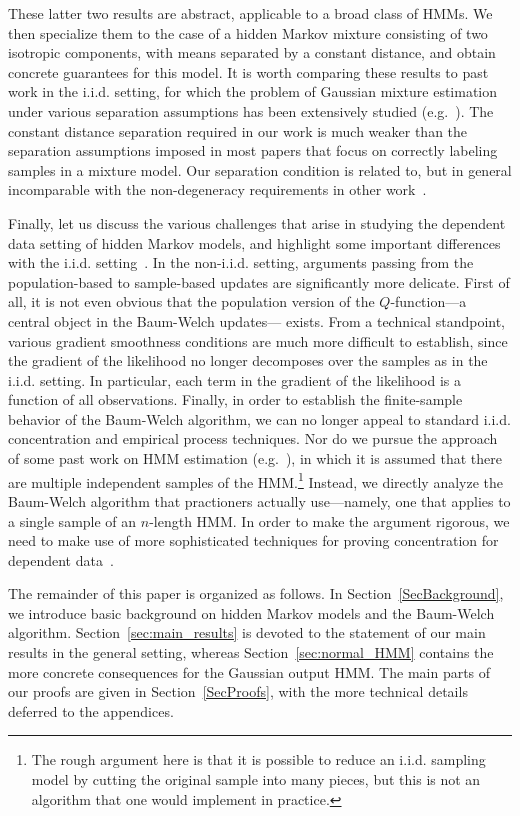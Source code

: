 \documentclass[twoside,11pt]{article}
\newcommand{\numobs}{\ensuremath{n}}
\begin{document}
These latter two results are abstract, applicable to a broad class of
HMMs. We then specialize them to the case of a hidden Markov mixture
consisting of two isotropic components, with means separated by a
constant distance, and obtain concrete guarantees for this model.  It
is worth comparing these results to past work in the i.i.d. setting,
for which the problem of Gaussian mixture estimation under various
separation assumptions has been extensively studied
(e.g.~\citep{dasgupta,vempala,belkin,moitra}). The constant distance
separation required in our work is much weaker than the separation
assumptions imposed in most papers that focus on correctly labeling
samples in a mixture model.  Our separation condition is related to,
but in general incomparable with the non-degeneracy requirements in
other work~\citep{Hsu12, hsumog, moitra}.


Finally, let us discuss the various challenges that arise in studying
the dependent data setting of hidden Markov models, and highlight some
important differences with the
i.i.d. setting~\citep{BalWaiYu14}.  In the non-i.i.d. setting,
arguments passing from the population-based to sample-based updates
are significantly more delicate. First of all, it is not even obvious
that the population version of the $Q$-function---a central object in
the Baum-Welch updates--- exists. From a technical standpoint, various
gradient smoothness conditions are much more difficult to establish,
since the gradient of the likelihood no longer decomposes over the
samples as in the i.i.d. setting. In particular, each term in the
gradient of the likelihood is a function of all observations. Finally,
in order to establish the finite-sample behavior of the Baum-Welch
algorithm, we can no longer appeal to standard i.i.d.  concentration
and empirical process techniques.  Nor do we pursue the approach of
some past work on HMM estimation (e.g.~\citep{Hsu12}), in which it is
assumed that there are multiple independent samples of the
HMM.\footnote{The rough argument here is that it is possible to reduce
  an i.i.d. sampling model by cutting the original sample into many
  pieces, but this is not an algorithm that one would implement in
  practice.} Instead, we directly analyze the Baum-Welch algorithm
that practioners actually use---namely, one that applies to a single
sample of an $\numobs$-length HMM.  In order to make the argument
rigorous, we need to make use of more sophisticated techniques for
proving concentration for dependent data~\citep{Yu94, NobDem93}.

The remainder of this paper is organized as follows.  In
Section~\ref{SecBackground}, we introduce basic background on hidden
Markov models and the Baum-Welch algorithm.
Section~\ref{sec:main_results} is devoted to the statement of our main
results in the general setting, whereas Section~\ref{sec:normal_HMM}
contains the more concrete consequences for the Gaussian output HMM.
The main parts of our proofs are given in Section~\ref{SecProofs},
with the more technical details deferred to the appendices.
\end{document}
